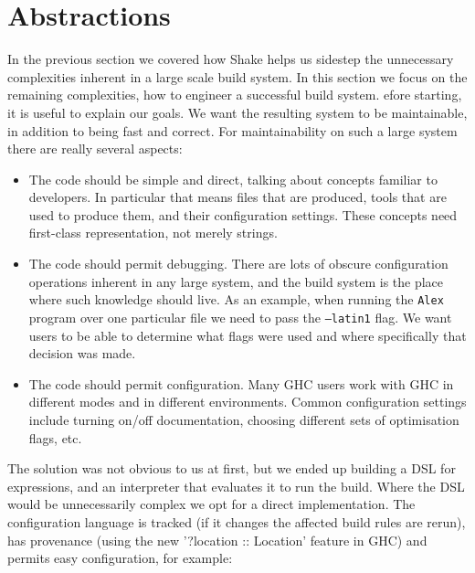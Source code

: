 \section{Abstractions\label{sec:abstractions}}


In the previous section we covered how Shake helps us sidestep the unnecessary
complexities inherent in a large scale build system. In this section we focus on
the remaining complexities, how to engineer a successful build system. efore
starting, it is useful to explain our goals. We want the resulting system to be
maintainable, in addition to being fast and correct. For maintainability on such
a large system there are really several aspects:

\begin{itemize}
\item The code should be simple and direct, talking about concepts familiar to
developers. In particular that means files that are produced, tools that are
used to produce them, and their configuration settings. These concepts
need first-class representation, not merely strings.
\item The code should permit debugging. There are lots of obscure configuration
operations inherent in any large system, and the build system is the place where
such knowledge should live. As an example, when running the \texttt{Alex}
program over one particular file we need to pass the \texttt{--latin1} flag. We
want users to be able to determine what flags were used and where specifically
that decision was made.
\item The code should permit configuration. Many GHC users work with GHC in
different modes and in different environments. Common configuration settings
include turning on/off documentation, choosing different sets of optimisation flags,
etc.
\end{itemize}

The solution was not obvious to us at first, but we ended up building a DSL for
expressions, and an interpreter that evaluates it to run the build. Where the
DSL would be unnecessarily complex we opt for a direct implementation. The
configuration language is tracked (if it changes the affected build rules are
rerun), has provenance (using the new \lst'?location :: Location' feature in
GHC) and permits easy configuration, for example:


